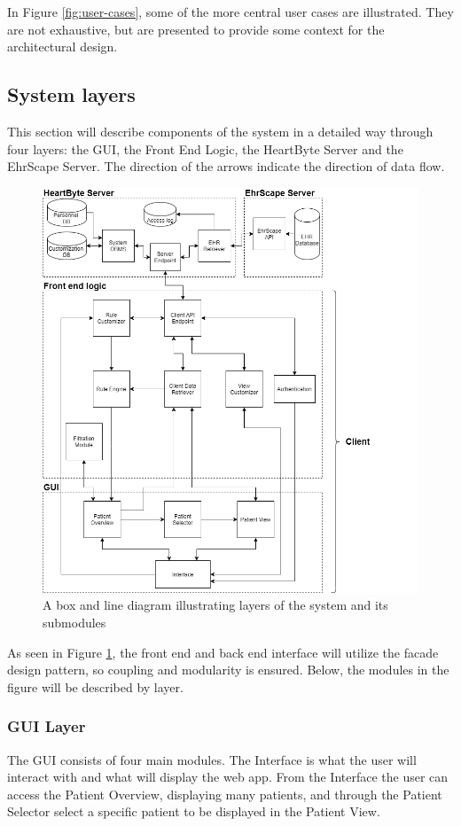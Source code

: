 \documentclass{article}
\begin{document}
In Figure \ref{fig:user-cases}, some of the more central user cases are illustrated. They are not exhaustive, but are presented to provide some context for the architectural design.

\subsection{System layers}
This section will describe components of the system in a detailed way through four layers: the GUI, the Front End Logic, the HeartByte Server and the EhrScape Server. The direction of the arrows indicate the direction of data flow.

\begin{figure}[h]
    \centering
    \includegraphics[scale = 0.45]{box-and-line}
    \caption{A box and line diagram illustrating layers of the system and its submodules}
    \label{fig:execution-view}
\end{figure}

As seen in Figure \ref{fig:execution-view}, the front end and back end interface will utilize the facade design pattern, so coupling and modularity is ensured. Below, the modules in the figure will be described by layer.

\subsubsection{GUI Layer}
The GUI consists of four main modules. The Interface is what the user will interact with and what will display the web app. From the Interface the user can access the Patient Overview, displaying many patients, and through the Patient Selector select a specific patient to be displayed in the Patient View. 
\end{document}
